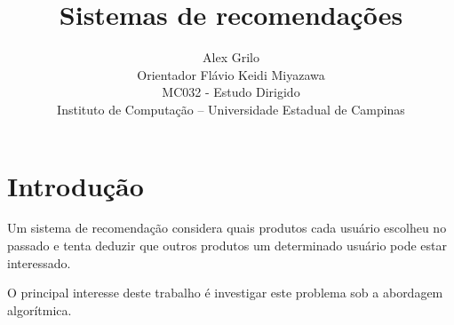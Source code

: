 \documentclass[a4paper,10pt]{article}
\title{Sistemas de recomendações}
\author{Alex Grilo \\ Orientador Flávio Keidi Miyazawa\\ MC032 - Estudo Dirigido \\ \normalsize{Instituto de Computação -- Universidade Estadual de Campinas}}
\numberwithin{equation}{section} %
\begin{document}
\maketitle

\section{Introdução}

Um sistema de recomendação considera quais produtos cada usuário
escolheu no passado e tenta deduzir que outros produtos um determinado
usuário pode estar interessado. 

O principal interesse deste trabalho é investigar este problema sob a
abordagem algorítmica.

\section{}

{}


\end{document}
